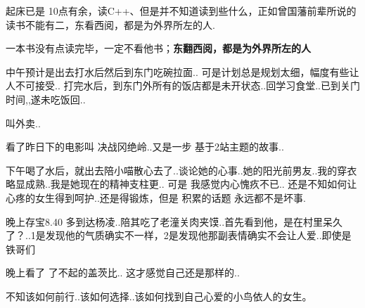 \documentclass[UTF8,a4paper,8pt]{ctexart}
\begin{document}
	 	 起床已是 10点有余，读C++、但是并不知道读到些什么，正如曾国藩前辈所说的读书不能有二，东看西阅，都是为外界所左的人.
	 	 
	 	 一本书没有点读完毕，一定不看他书；\textbf{东翻西阅，都是为外界所左的人}
	 	 
	 	 中午预计是出去打水后然后到东门吃碗拉面..
	 	 可是计划总是规划太细，幅度有些让人不可接受.. 打完水后，到东门外所有的饭店都是未开状态..回学习食堂..已到关门时间,,遂未吃饭回..
	 	 
	 	 叫外卖..
	 	 
	 	 看了昨日下的电影叫 决战冈绝岭..又是一步 基于2站主题的故事..
	 	 
	 	 下午喝了水后，就出去陪小喵散心去了..谈论她的心事..她的阳光前男友..我的穿衣略显成熟..我是她现在的精神支柱更..
	 	 可是 我感觉内心愧疚不已.. 还是不知如何让心疼的女生得到呵护..还是得锻炼，但是 积累的话题 永远都不是坏事.
	 	 
	 	 晚上存宝8.40 多到达杨凌..陪其吃了老潼关肉夹馍..首先看到他，是在村里呆久了？..1是发现他的气质确实不一样，2是发现他那副表情确实不会让人爱..即使是铁哥们
	 	 
	 	 晚上看了 了不起的盖茨比.. 这才感觉自己还是那样的..
	 	 
	 	 不知该如何前行..该如何选择..该如何找到自己心爱的小鸟依人的女生。
	 	 
\end{document}
